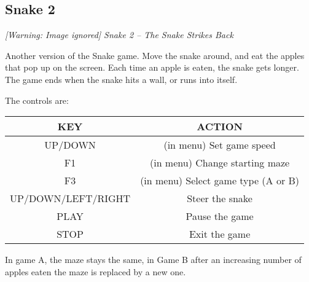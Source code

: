 \subsection{ Snake 2}
{\centering\itshape
  [Warning: Image ignored] %
 \newline
Snake 2 {--} The Snake Strikes Back
\par}

Another version of the Snake game. Move the snake around, and eat the
apples that pop up on the screen. Each time an apple is eaten, the
snake gets longer. The game ends when the snake hits a wall, or runs
into itself. 

The controls are:

\begin{table}[h!]
\begin{center}
\begin{tabular}{|c|c|}
\hline
KEY & ACTION \\\hline
UP/DOWN & (in menu) Set game speed \\\hline
F1 & (in menu) Change starting maze \\\hline
F3 & (in menu) Select game type (A or B) \\\hline
UP/DOWN/LEFT/RIGHT & Steer the snake \\\hline
PLAY & Pause the game \\\hline
STOP & Exit the game \\\hline
\end{tabular}
\end{center}
\end{table}
In game A, the maze stays the same, in Game B
after an increasing number of apples eaten the maze is replaced by a
new one.


